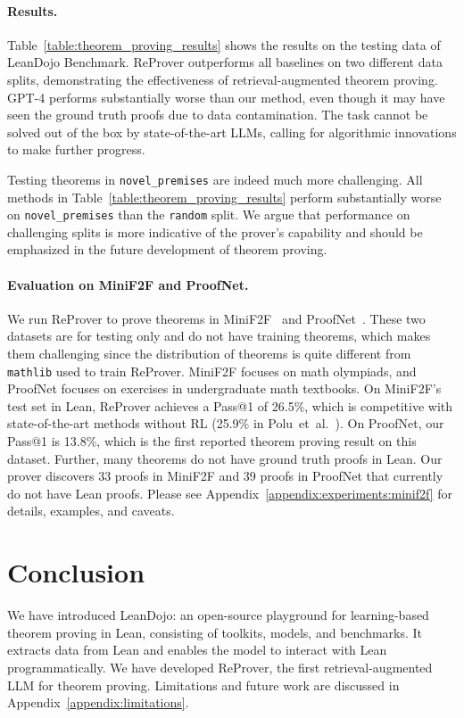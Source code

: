 \documentclass{article}
\newcommand{\smallsec}[1]{\vspace{-1mm} \paragraph{#1.}}
\newcommand\name{ReProver}
\begin{document}



\smallsec{Results} 
Table~\ref{table:theorem_proving_results} shows the results on the testing data of LeanDojo Benchmark. {\name} outperforms all baselines on two different data splits, demonstrating the effectiveness of retrieval-augmented theorem proving. GPT-4 performs substantially worse than our method, even though it may have seen the ground truth proofs due to data contamination. The task cannot be solved out of the box by state-of-the-art LLMs, calling for algorithmic innovations to make further progress.

Testing theorems in \texttt{novel\_premises} are indeed much more challenging. All methods in Table~\ref{table:theorem_proving_results} perform substantially worse on \texttt{novel\_premises} than the \texttt{random} split. We argue that performance on challenging splits is more indicative of the prover's capability and should be emphasized in the future development of theorem proving.

\smallsec{Evaluation on MiniF2F and ProofNet}
We run {\name} to prove theorems in MiniF2F~\cite{zheng2022minif2f} and ProofNet~\cite{azerbayev2023proofnet}. These two datasets are for testing only and do not have training theorems, which makes them challenging since the distribution of theorems is quite different from \texttt{mathlib} used to train {\name}. MiniF2F focuses on math olympiads, and ProofNet focuses on exercises in undergraduate math textbooks. On MiniF2F's test set in Lean, {\name} achieves a Pass@1 of 26.5\%, which is competitive with state-of-the-art methods without RL (25.9\% in Polu~et~al.~\cite{polu2023formal}). On ProofNet, our Pass@1 is 13.8\%, which is the first reported theorem proving result on this dataset. Further, many theorems do not have ground truth proofs in Lean. Our prover discovers 33 proofs in MiniF2F and 39 proofs in ProofNet that currently do not have Lean proofs. Please see Appendix~\ref{appendix:experiments:minif2f} for details, examples, and caveats.



\section{Conclusion}
We have introduced LeanDojo: an open-source playground for learning-based theorem proving in Lean, consisting of toolkits, models, and benchmarks. It extracts data from Lean and enables the model to interact with Lean programmatically. We have developed {\name}, the first retrieval-augmented LLM for theorem proving. Limitations and future work are discussed in Appendix~\ref{appendix:limitations}.
\end{document}
